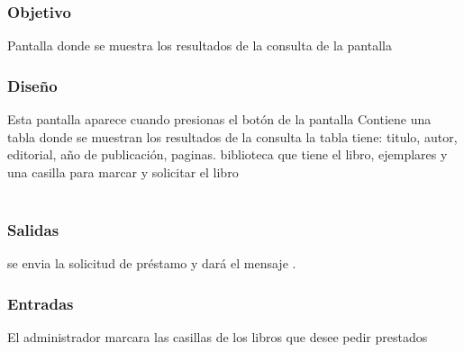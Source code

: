 \subsubsection{Objetivo}
	Pantalla donde se muestra los resultados de la consulta de la pantalla 

\subsubsection{Diseño}
	Esta pantalla aparece cuando presionas el botón  de la pantalla  Contiene una tabla donde se muestran los resultados de la consulta la tabla tiene: titulo, autor, editorial, año de publicación, paginas. biblioteca que tiene el libro, ejemplares y una casilla para marcar y solicitar el libro  \\\\


\subsubsection{Salidas}
	\begin{Citemize}
		\item se envia la solicitud de préstamo y dará el mensaje . 
	\end{Citemize}
	
\subsubsection{Entradas}
	\begin{Citemize}
		\item El administrador marcara las casillas de los libros que desee pedir prestados
	\end{Citemize}



